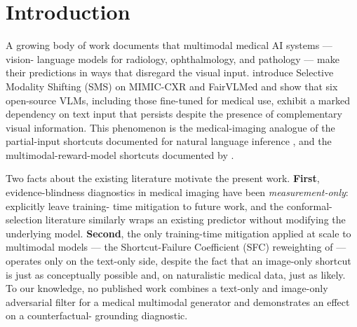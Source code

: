 \documentclass{article}
\begin{document}
\section{Introduction}
\label{sec:intro}

A growing body of work documents that multimodal medical AI systems --- vision-
language models for radiology, ophthalmology, and pathology --- make their
predictions in ways that disregard the visual input. \citet{restrepo2025sms}
introduce Selective Modality Shifting (SMS) on MIMIC-CXR and FairVLMed and
show that six open-source VLMs, including those fine-tuned for medical use,
exhibit a marked dependency on text input that persists despite the
presence of complementary visual information. This phenomenon is the
medical-imaging analogue of the partial-input shortcuts documented for
natural language inference \citep{gururangan2018annotation,
poliak2018hypothesis}, and the multimodal-reward-model shortcuts documented
by \citet{li2025sfc}.

Two facts about the existing literature motivate the present work.
\textbf{First}, evidence-blindness diagnostics in medical imaging have been
\emph{measurement-only}: \citet{restrepo2025sms} explicitly leave training-
time mitigation to future work, and the conformal-selection literature
\citep{gui2024conformal,li2025conflvlm,mohri2024conformal} similarly
wraps an existing predictor without modifying the underlying model.
\textbf{Second}, the only training-time mitigation applied at scale to
multimodal models --- the Shortcut-Failure Coefficient (SFC) reweighting of
\citet{li2025sfc} --- operates only on the text-only side, despite the
fact that an image-only shortcut is just as conceptually possible and, on
naturalistic medical data, just as likely. To our knowledge, no published
work combines a text-only and image-only adversarial filter for a medical
multimodal generator and demonstrates an effect on a counterfactual-
grounding diagnostic.
\end{document}
